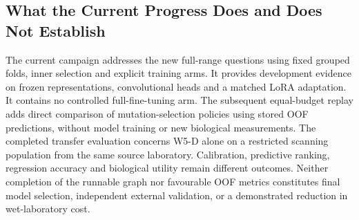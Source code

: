 \subsection{What the Current Progress Does and Does Not Establish}
The current campaign addresses the new full-range questions using fixed grouped folds, inner
selection and explicit training arms. It provides development evidence on frozen representations,
convolutional heads and a matched LoRA adaptation. It contains no controlled full-fine-tuning arm.
The subsequent equal-budget replay adds direct comparison of mutation-selection policies using
stored OOF predictions, without model training or new biological measurements.
The completed transfer evaluation concerns W5-D alone on a restricted scanning population from
the same source laboratory. Calibration, predictive ranking, regression accuracy and biological
utility remain different outcomes. Neither completion of the runnable graph nor favourable OOF
metrics constitutes final model selection, independent external validation, or a demonstrated
reduction in wet-laboratory cost.
